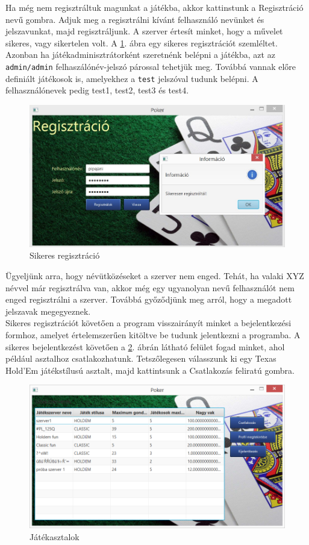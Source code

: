 Ha még nem regisztráltuk magunkat a játékba, akkor kattinstunk a Regisztráció nevű gombra. Adjuk meg a regisztrálni kívánt felhasználó nevünket és jelszavunkat, majd regisztráljunk. A szerver értesít minket, hogy a művelet sikeres, vagy sikertelen volt. A \ref{fig:reg_succ}. ábra egy sikeres regisztrációt szemléltet. Azonban ha játékadminisztrátorként szeretnénk belépni a játékba, azt az \texttt{admin/admin} felhaszálónév-jelszó párossal tehetjük meg. Továbbá vannak előre definiált játékosok is, amelyekhez a \texttt{test} jelszóval tudunk belépni. A felhasználónevek pedig test1, test2, test3 és test4.
\begin{figure}[h!]
  \caption{Sikeres regisztráció}
  \label{fig:reg_succ}
  \centering
    \includegraphics[width=12cm]{user-documentation/images/succ_reg.jpg}
\end{figure}
Ügyeljünk arra, hogy névütközéseket a szerver nem enged. Tehát, ha valaki XYZ névvel már regisztrálva van, akkor még egy ugyanolyan nevű felhasználót nem enged regisztrálni a szerver. Továbbá győződjünk meg arról, hogy a megadott jelszavak megegyeznek.  \\
Sikeres regisztrációt követően a program visszairányít minket a bejelentkezési formhoz, amelyet értelemszerűen kitöltve be tudunk jelentkezni a programba.
A sikeres bejelentkezést követően a \ref{fig:poker_tables}. ábrán látható felület fogad minket, ahol például asztalhoz csatlakozhatunk. Tetszőlegesen válasszunk ki egy Texas Hold'Em játékstílusú asztalt, majd kattintsunk a Csatlakozás feliratú gombra.
\begin{figure}[h!]
  \caption{Játékasztalok}
  \label{fig:poker_tables}
  \centering
    \includegraphics[width=12cm]{user-documentation/images/tables.jpg}
\end{figure}

